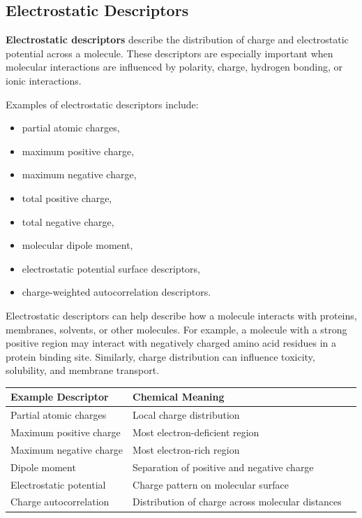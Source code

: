 \documentclass[11pt]{report}
\newenvironment{Important note}{\begin{quote}\color{red}\textbf{Important note:} }{\end{quote}}
\begin{document}
\subsection{Electrostatic Descriptors}

\textbf{Electrostatic descriptors} describe the distribution of charge and electrostatic potential across a molecule. These descriptors are especially important when molecular interactions are influenced by polarity, charge, hydrogen bonding, or ionic interactions.

Examples of electrostatic descriptors include:

\begin{itemize}[leftmargin=*]
    \item partial atomic charges,
    \item maximum positive charge,
    \item maximum negative charge,
    \item total positive charge,
    \item total negative charge,
    \item molecular dipole moment,
    \item electrostatic potential surface descriptors,
    \item charge-weighted autocorrelation descriptors.
\end{itemize}

Electrostatic descriptors can help describe how a molecule interacts with proteins, membranes, solvents, or other molecules. For example, a molecule with a strong positive region may interact with negatively charged amino acid residues in a protein binding site. Similarly, charge distribution can influence toxicity, solubility, and membrane transport.

\begin{center}
\begin{tabular}{lll}
\toprule
\textbf{Example Descriptor} & \textbf{Chemical Meaning} \\
\midrule
Partial atomic charges & Local charge distribution \\
Maximum positive charge & Most electron-deficient region \\
Maximum negative charge & Most electron-rich region \\
Dipole moment & Separation of positive and negative charge \\
Electrostatic potential & Charge pattern on molecular surface \\
Charge autocorrelation & Distribution of charge across molecular distances \\
\bottomrule
\end{tabular}
\end{center}
\end{document}
